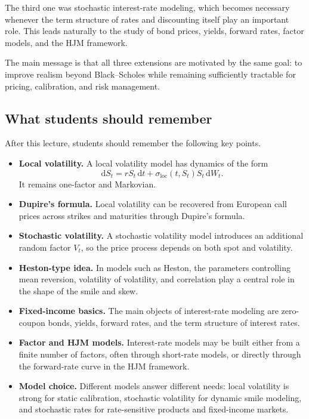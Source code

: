 \documentclass[11pt]{article}
\theoremstyle{plain}
\theoremstyle{definition}
\theoremstyle{remark}
\begin{document}
The third one was stochastic interest-rate modeling, which becomes
necessary whenever the term structure of rates and discounting itself
play an important role.
This leads naturally to the study of bond prices, yields, forward rates,
factor models, and the HJM framework.

The main message is that all three extensions are motivated by the same
goal:
to improve realism beyond Black--Scholes while remaining sufficiently
tractable for pricing, calibration, and risk management.

\subsection{What students should remember}

After this lecture, students should remember the following key points.

\begin{itemize}[leftmargin=1.4em]
    \item \textbf{Local volatility.}
    A local volatility model has dynamics of the form
    \[
    \mathrm{d}S_t=rS_t\,\mathrm{d}t+\sigma_{\mathrm{loc}}(t,S_t)S_t\,\mathrm{d}W_t.
    \]
    It remains one-factor and Markovian.

    \item \textbf{Dupire's formula.}
    Local volatility can be recovered from European call prices across
    strikes and maturities through Dupire's formula.

    \item \textbf{Stochastic volatility.}
    A stochastic volatility model introduces an additional random factor
    \(V_t\), so the price process depends on both spot and volatility.

    \item \textbf{Heston-type idea.}
    In models such as Heston, the parameters controlling mean reversion,
    volatility of volatility, and correlation play a central role in the
    shape of the smile and skew.

    \item \textbf{Fixed-income basics.}
    The main objects of interest-rate modeling are zero-coupon bonds,
    yields, forward rates, and the term structure of interest rates.

    \item \textbf{Factor and HJM models.}
    Interest-rate models may be built either from a finite number of
    factors, often through short-rate models, or directly through the
    forward-rate curve in the HJM framework.

    \item \textbf{Model choice.}
    Different models answer different needs:
    local volatility is strong for static calibration,
    stochastic volatility for dynamic smile modeling,
    and stochastic rates for rate-sensitive products and fixed-income
    markets.
\end{itemize}
\end{document}

